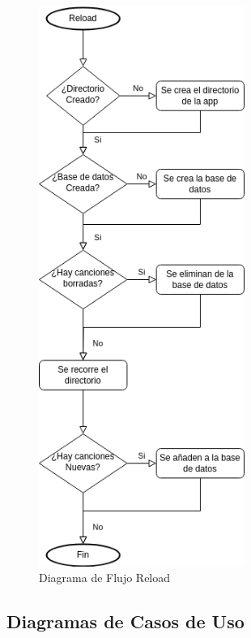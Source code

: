 \documentclass[11pt, a4paper]{article}
\begin{document}
  \begin{figure}[H]
    \centering
    \includegraphics[width=0.6\textwidth]{media/Diagrama de Flujo 1.drawio.png}
    \caption{Diagrama de Flujo Reload}
    \label{fig:reload}
  \end{figure}

  \subsection{Diagramas de Casos de Uso}
\end{document}
